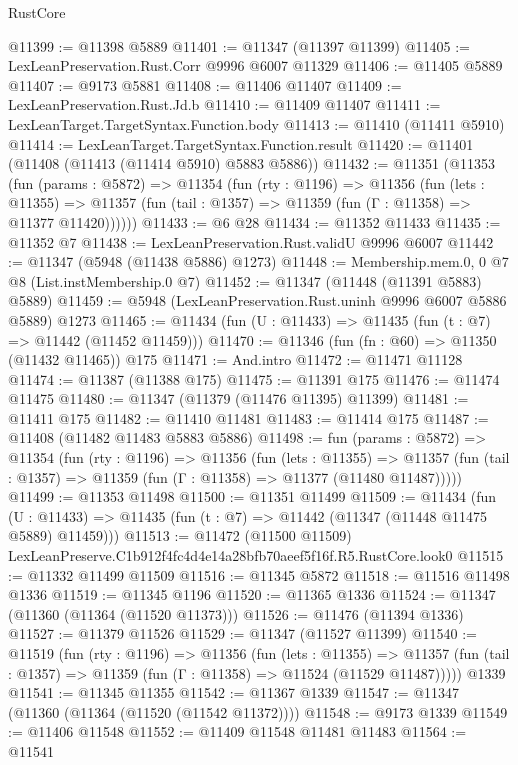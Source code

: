 \begin{lexlean}{RustCore}
\begin{coremodule}
@11399 := @11398 @5889
@11401 := @11347 (@11397 @11399)
@11405 := LexLeanPreservation.Rust.Corr @9996 @6007 @11329
@11406 := @11405 @5889
@11407 := @9173 @5881
@11408 := @11406 @11407
@11409 := LexLeanPreservation.Rust.Jd.b
@11410 := @11409 @11407
@11411 := LexLeanTarget.TargetSyntax.Function.body
@11413 := @11410 (@11411 @5910)
@11414 := LexLeanTarget.TargetSyntax.Function.result
@11420 := @11401 (@11408 (@11413 (@11414 @5910) @5883 @5886))
@11432 := @11351
    (@11353
      (fun (params : @5872) =>
      @11354
        (fun (rty : @1196) =>
        @11356
          (fun (lets : @11355) =>
          @11357 (fun (tail : @1357) => @11359 (fun (Γ : @11358) => @11377 @11420))))))
@11433 := @6 @28
@11434 := @11352 @11433
@11435 := @11352 @7
@11438 := LexLeanPreservation.Rust.validU @9996 @6007
@11442 := @11347 (@5948 (@11438 @5886) @1273)
@11448 := Membership.mem.{0, 0} @7 @8 (List.instMembership.{0} @7)
@11452 := @11347 (@11448 (@11391 @5883) @5889)
@11459 := @5948 (LexLeanPreservation.Rust.uninh @9996 @6007 @5886 @5889) @1273
@11465 := @11434 (fun (U : @11433) => @11435 (fun (t : @7) => @11442 (@11452 @11459)))
@11470 := @11346 (fun (fn : @60) => @11350 (@11432 @11465)) @175
@11471 := And.intro
@11472 := @11471 @11128
@11474 := @11387 (@11388 @175)
@11475 := @11391 @175
@11476 := @11474 @11475
@11480 := @11347 (@11379 (@11476 @11395) @11399)
@11481 := @11411 @175
@11482 := @11410 @11481
@11483 := @11414 @175
@11487 := @11408 (@11482 @11483 @5883 @5886)
@11498 := fun (params : @5872) =>
  @11354
    (fun (rty : @1196) =>
    @11356
      (fun (lets : @11355) =>
      @11357 (fun (tail : @1357) => @11359 (fun (Γ : @11358) => @11377 (@11480 @11487)))))
@11499 := @11353 @11498
@11500 := @11351 @11499
@11509 := @11434
    (fun (U : @11433) => @11435 (fun (t : @7) => @11442 (@11347 (@11448 @11475 @5889) @11459)))
@11513 := @11472 (@11500 @11509) LexLeanPreserve.C1b912f4fc4d4e14a28bfb70aeef5f16f.R5.RustCore.look0
@11515 := @11332 @11499 @11509
@11516 := @11345 @5872
@11518 := @11516 @11498 @1336
@11519 := @11345 @1196
@11520 := @11365 @1336
@11524 := @11347 (@11360 (@11364 (@11520 @11373)))
@11526 := @11476 (@11394 @1336)
@11527 := @11379 @11526
@11529 := @11347 (@11527 @11399)
@11540 := @11519
    (fun (rty : @1196) =>
    @11356
      (fun (lets : @11355) =>
      @11357 (fun (tail : @1357) => @11359 (fun (Γ : @11358) => @11524 (@11529 @11487)))))
    @1339
@11541 := @11345 @11355
@11542 := @11367 @1339
@11547 := @11347 (@11360 (@11364 (@11520 (@11542 @11372))))
@11548 := @9173 @1339
@11549 := @11406 @11548
@11552 := @11409 @11548 @11481 @11483
@11564 := @11541

\end{coremodule}
\end{lexlean}
